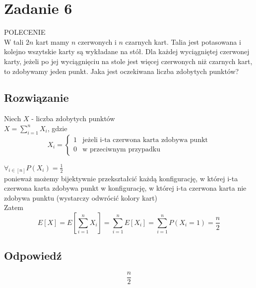 \section{Zadanie 6}
POLECENIE\\
W tali \(2n\) kart mamy \(n\) czerwonych i \(n\) czarnych kart. Talia jest potasowana i kolejno wszytskie karty są wykładane na stół. Dla każdej wyciągniętej czerwonej karty, jeżeli po jej wyciągnięciu na stole jest więcej czerwonych niż czarnych kart, to zdobywamy jeden punkt. Jaka jest oczekiwana liczba zdobytych punktów?\\

\subsection*{Rozwiązanie}
Niech \(X\) - liczba zdobytych punktów\\
\(X = \sum_{i=1}^n X_i\), gdzie \\
\[
	X_i = \left\{
	\begin{array}{ll}
		1 & \text{jeżeli i-ta czerwona karta zdobywa punkt} \\
		0 & \text{w przeciwnym przypadku}
	\end{array}
	\right.
\]

\(\forall_{i\in[n]} P(X_i) = \frac{1}{2}\)\\
ponieważ możemy bijektywnie przekształcić każdą konfigurację, w której i-ta czerwona karta zdobywa punkt w konfigurację, w której i-ta czerwona karta nie zdobywa punktu (wystarczy odwrócić kolory kart)\\
Zatem
\[
	E[X] = E\left[\sum_{i=1}^{n}X_{i}\right] = \sum_{i=1}^{n}E[X_{i}] = \sum_{i=1}^{n}P(X_{i} = 1) = \frac{n}{2}
\]

\subsection*{Odpowiedź}
\[
	\boxed{\text{\(\frac{n}{2}\)}}
\]
